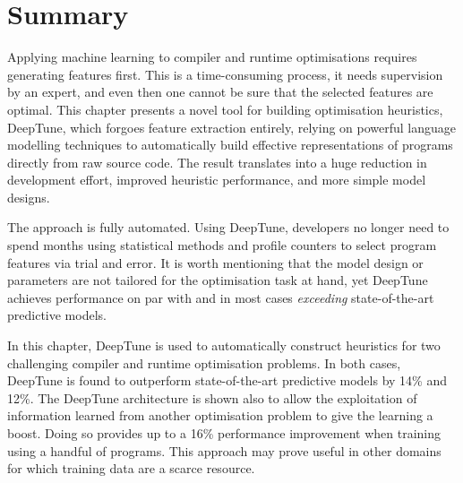 \newpage %
\section{Summary}
\label{sec:deeptune-conclusion}

Applying machine learning to compiler and runtime optimisations requires generating features first. This is a time-consuming process, it needs supervision by an expert, and even then one cannot be sure that the selected features are optimal. This chapter presents a novel tool for building optimisation heuristics, DeepTune, which forgoes feature extraction entirely, relying on powerful language modelling techniques to automatically build effective representations of programs directly from raw source code. The result translates into a huge reduction in development effort, improved heuristic performance, and more simple model designs.

The approach is fully automated. Using DeepTune, developers no longer need to spend months using statistical methods and profile counters to select program features via trial and error. It is worth mentioning that the model design or parameters are not tailored for the optimisation task at hand, yet DeepTune achieves performance on par with and in most cases \emph{exceeding} state-of-the-art predictive models.

In this chapter, DeepTune is used to automatically construct heuristics for two challenging compiler and runtime optimisation problems. In both cases, DeepTune is found to outperform state-of-the-art predictive models by 14\% and 12\%. The DeepTune architecture is shown also to allow the exploitation of information learned from another optimisation problem to give the learning a boost. Doing so provides up to a 16\% performance improvement when training using a handful of programs. This approach may prove useful in other domains for which training data are a scarce resource.
